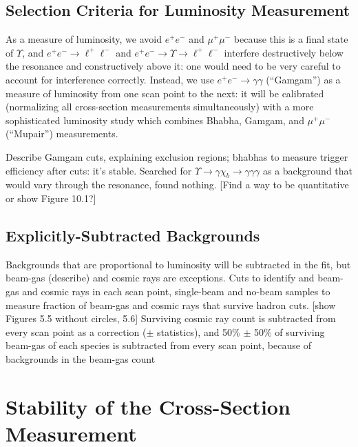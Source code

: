 \documentclass[aps,prd,preprint,superscriptaddress,tightenlines,nofootinbib,floatfix]{revtex4}
\begin{document}
%
\subsection{Selection Criteria for Luminosity Measurement}
%

As a measure of luminosity, we avoid $e^+e^-$ and $\mu^+\mu^-$ because
this is a final state of $\Upsilon$, and $e^+e^- \to \ell^+\ell^-$ and
$e^+e^- \to \Upsilon \to \ell^+\ell^-$ interfere destructively below
the resonance and constructively above it: one would need to be very
careful to account for interference correctly.  Instead, we use
$e^+e^- \to \gamma\gamma$ (``Gamgam'') as a measure of luminosity from
one scan point to the next: it will be calibrated (normalizing all
cross-section measurements simultaneously) with a more sophisticated
luminosity study which combines Bhabha, Gamgam, and $\mu^+\mu^-$
(``Mupair'') measurements.

Describe Gamgam cuts, explaining exclusion regions; bhabhas to measure
trigger efficiency after cuts: it's stable.  Searched for $\Upsilon
\to \gamma \chi_b \to \gamma \gamma \gamma$ as a background that would
vary through the resonance, found nothing.  [Find a way to be
quantitative or show Figure 10.1?]

%
\subsection{Explicitly-Subtracted Backgrounds}
%

Backgrounds that are proportional to luminosity will be subtracted in
the fit, but beam-gas (describe) and cosmic rays are exceptions.  Cuts
to identify and beam-gas and cosmic rays in each scan point,
single-beam and no-beam samples to measure fraction of beam-gas and
cosmic rays that survive hadron cuts.  [show Figures 5.5 without
circles, 5.6] Surviving cosmic ray count is subtracted from every scan
point as a correction ($\pm$ statistics), and 50\% $\pm$ 50\% of
surviving beam-gas of each species is subtracted from every scan
point, because of backgrounds in the beam-gas count

%
\section{Stability of the Cross-Section Measurement}
%
\end{document}
